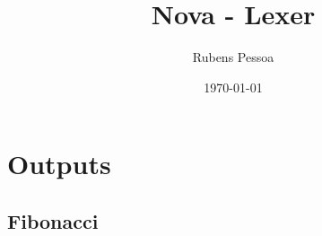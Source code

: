 \documentclass[a4paper, 12pt, article]{memoir}
\title{Nova - Lexer}
\author{Rubens Pessoa}
\date{\today}
\begin{document}
\frontmatter
\begin{titlingpage}
  \maketitle
\end{titlingpage}

\tableofcontents

\mainmatter

\section{Outputs}
\label{sec:era e lex}

\subsection{Fibonacci}
\label{subsec:fib}
\end{document}
